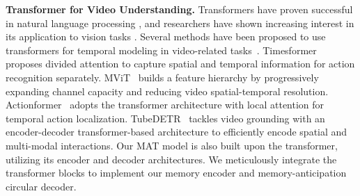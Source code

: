 \textbf{Transformer for Video Understanding.} Transformers have proven successful in natural language processing \cite{transformer}, and researchers have shown increasing interest in its application to vision tasks \cite{vit, deit, swin, pvt, omnivore, li2023fb}. Several methods have been proposed to use transformers for temporal modeling in video-related tasks~\cite{vivit, longformer, videollm, cpmt, li2022uniformerv2, li2023unmasked, TadTR, linformer, wang2022internvideo, vidtr}.
Timesformer~\cite{timesformer} proposes divided attention to capture spatial and temporal information for action recognition separately. 
MViT~\cite{mvit} builds a feature hierarchy by progressively expanding channel capacity and reducing video spatial-temporal resolution. Actionformer~\cite{actionformer} adopts the transformer architecture with local attention for temporal action localization. 
TubeDETR~\cite{tubedetr} tackles video grounding with an encoder-decoder transformer-based architecture to efficiently encode spatial and multi-modal interactions.
Our MAT model is also built upon the transformer, utilizing its encoder and decoder architectures. We meticulously integrate the transformer blocks to implement our memory encoder and memory-anticipation circular decoder.
 



